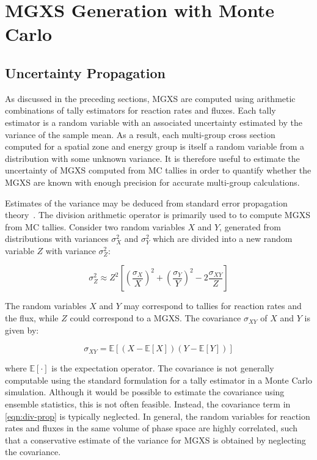 \section{MGXS Generation with Monte Carlo}
\label{sec:mgxs-mc}

\subsection{Uncertainty Propagation}
\label{subsec:uncertainty-prop}

As discussed in the preceding sections, MGXS are computed using arithmetic combinations of tally estimators for reaction rates and fluxes. Each tally estimator is a random variable with an associated uncertainty estimated by the variance of the sample mean. As a result, each multi-group cross section computed for a spatial zone and energy group is itself a random variable from a distribution with some unknown variance. It is therefore useful to estimate the uncertainty of MGXS computed from MC tallies in order to quantify whether the MGXS are known with enough precision for accurate multi-group calculations. 

Estimates of the variance may be deduced from standard error propagation theory~\cite{bevington2003data}. The division arithmetic operator is primarily used to to compute MGXS from MC tallies. Consider two random variables $X$ and $Y$, generated from distributions with variances $\sigma_{X}^2$ and $\sigma_{Y}^2$ which are divided into a new random variable $Z$ with variance $\sigma_{Z}^2$:

\begin{equation}
\label{eqn:div-prop}
\sigma_{Z}^{2} \approx Z^{2}\left[\left(\frac{\sigma_{X}}{X}\right)^{2} + \left(\frac{\sigma_{Y}}{Y}\right)^{2} - 2\frac{\sigma_{XY}}{Z}\right]
\end{equation}

\noindent The random variables $X$ and $Y$ may correspond to tallies for reaction rates and the flux, while $Z$ could correspond to a MGXS. The covariance $\sigma_{XY}$ of $X$ and $Y$ is given by:

\begin{equation}
\label{eqn:chap3-covariance}
\sigma_{XY} = \mathbb{E}[(X - \mathbb{E}[X])(Y - \mathbb{E}[Y])]
\end{equation}

\noindent where $\mathbb{E}[\cdot]$ is the expectation operator. The covariance is not generally computable using the standard formulation for a tally estimator in a Monte Carlo simulation. Although it would be possible to estimate the covariance using ensemble statistics, this is not often feasible. Instead, the covariance term in \autoref{eqn:div-prop} is typically neglected. In general, the random variables for reaction rates and fluxes in the same volume of phase space are highly correlated, such that a conservative estimate of the variance for MGXS is obtained by neglecting the covariance.
